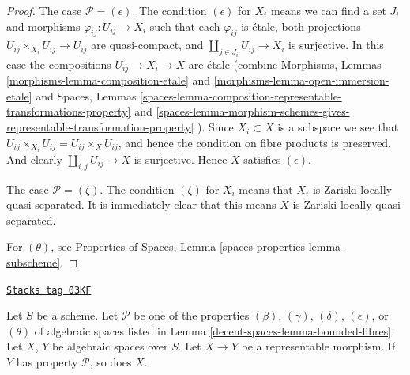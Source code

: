 \begin{proof}
\medskip\noindent
The case $\mathcal{P} = (\epsilon)$. The condition $(\epsilon)$ for $X_i$ means
we can find a set $J_i$ and morphisms
$\varphi_{ij} : U_{ij} \to X_i$ such that each $\varphi_{ij}$
is \'etale, both projections $U_{ij} \times_{X_i} U_{ij} \to U_{ij}$
are quasi-compact, and $\coprod_{j \in J_i} U_{ij} \to X_i$ is surjective.
In this case the compositions $U_{ij} \to X_i \to X$ are \'etale
(combine
Morphisms, Lemmas
\ref{morphisms-lemma-composition-etale} and
\ref{morphisms-lemma-open-immersion-etale}
and
Spaces, Lemmas
\ref{spaces-lemma-composition-representable-transformations-property} and
\ref{spaces-lemma-morphism-schemes-gives-representable-transformation-property}
).
Since $X_i \subset X$ is a subspace we see that
$U_{ij} \times_{X_i} U_{ij} = U_{ij} \times_X U_{ij}$, and hence the
condition on fibre products is preserved. And clearly
$\coprod_{i, j} U_{ij} \to X$ is surjective. Hence $X$
satisfies $(\epsilon)$.

\medskip\noindent
The case $\mathcal{P} = (\zeta)$. The condition $(\zeta)$ for $X_i$
means that $X_i$ is Zariski locally quasi-separated. It is immediately
clear that this means $X$ is Zariski locally quasi-separated.

\medskip\noindent
For $(\theta)$, see
Properties of Spaces,
Lemma \ref{spaces-properties-lemma-subscheme}.
\end{proof}

\begin{lemma}
\label{decent-spaces-lemma-representable-properties}
\href{https://stacks.math.columbia.edu/tag/03KF}{\texttt{Stacks tag 03KF}}

Let $S$ be a scheme. Let $\mathcal{P}$ be one of the properties
$(\beta)$, $(\gamma)$, $(\delta)$, $(\epsilon)$, or
$(\theta)$ of algebraic spaces listed in
Lemma \ref{decent-spaces-lemma-bounded-fibres}.
Let $X$, $Y$ be algebraic spaces over $S$.
Let $X \to Y$ be a representable morphism.
If $Y$ has property $\mathcal{P}$, so does $X$.
\end{lemma}

